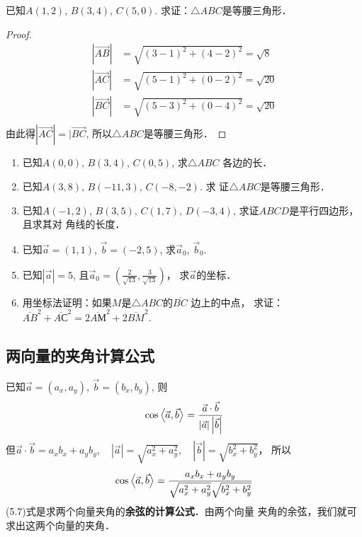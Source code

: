 \begin{example}
    已知$A(1,2)$, $B(3,4)$, $C(5,0)$. 求证：$\triangle ABC$是等腰三角形．
\end{example}

\begin{proof}
\[\begin{split}
|\Vec{AB}|&=\sqrt{(3-1)^2+(4-2)^2}=\sqrt{8}\\
|\Vec{AC}|&=\sqrt{(5-1)^2+(0-2)^2}=\sqrt{20}\\
|\Vec{BC}|&=\sqrt{(5-3)^2+(0-4)^2}=\sqrt{20}\\
\end{split}\]
由此得$|\Vec{AC}|=|\Vec{BC}$, 所以$\triangle ABC$是等腰三角形．
\end{proof}

\begin{ex}
\begin{enumerate}
    \item 已知$A(0,0)$, $B(3,4)$, $C(0,5)$, 求$\triangle ABC$
    各边的长．
    \item 已知$A(3,8)$, $B(-11,3)$, $C(-8,-2)$. 求
    证$\triangle ABC$是等腰三角形．
    \item 已知$A(-1,2)$, $B(3,5)$, $C(1,7)$, 
    $D(-3,4)$, 求证$ABCD$是平行四边形，且求其对
    角线的长度．
    \item 已知$\vec{a}=(1,1)$, $\vec{b}=(-2,5)$, 求$\vec{a}_0$, $\vec{b}_0$.
    \item 已知$|\vec{a}|=5$, 且$\vec{a}_0=\left(\frac{2}{\sqrt{13}},\frac{3}{\sqrt{13}}\right)$，
    求$\vec{a}$的坐标．
    \item 用坐标法证明：如果$M$是$\triangle ABC$的$\overline{BC}$
    边上的中点，
    求证：$\overline{AB}^2+\overline{AС}^2=2\overline{AМ}^2+2\overline{BM}^2$.
\end{enumerate}
\end{ex}

\subsection{两向量的夹角计算公式}

已知$\vec{a}=(a_x,a_y)$, $\vec{b}=(b_x,b_y)$, 则
\[\cos\left\langle \vec{a},\vec{b} \right\rangle=\dfrac{\vec{a}\cdot \vec{b}}{|\vec{a}|\left|\vec{b}\right|}\]
但$\vec{a}\cdot \vec{b}=a_xb_x+a_yb_y,\quad |\vec{a}|=\sqrt{a_x^2+a_y^2},\quad \left|\vec{b}\right|=\sqrt{b_x^2+b_y^2}$，
所以
\begin{equation}
    \cos\left\langle \vec{a},\vec{b} \right\rangle=\dfrac{a_xb_x+a_yb_y}{\sqrt{a_x^2+a_y^2}\sqrt{b_x^2+b_y^2}}
\end{equation}
(5.7)式是求两个向量夹角的\textbf{余弦的计算公式}．由两个向量
夹角的余弦，我们就可求出这两个向量的夹角．

